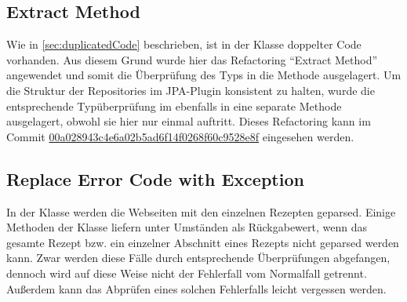 \subsection{Extract Method}
Wie in \autoref{sec:duplicatedCode} beschrieben, ist in der Klasse \href{https://github.com/anditru/quickie/blob/bb41442c7f1ffbfcd3117cd86a40f7932e543a33/0-quickie-plugin-jpa/src/main/java/org/pinkcrazyunicorn/quickie/plugins/jpa/JPAProfileRepository.java}{} doppelter Code vorhanden. Aus diesem Grund wurde hier das Refactoring \enquote{Extract Method} angewendet und somit die Überprüfung des Typs in die Methode \href{https://github.com/anditru/quickie/blob/d39394fa4590c1fd7fadc7974ee37c5416c0fc93/0-quickie-plugin-jpa/src/main/java/org/pinkcrazyunicorn/quickie/plugins/jpa/JPAProfileRepository.java#L81}{} ausgelagert. Um die Struktur der Repositories im JPA-Plugin konsistent zu halten, wurde die entsprechende Typüberprüfung im \href{https://github.com/anditru/quickie/blob/master/0-quickie-plugin-jpa/src/main/java/org/pinkcrazyunicorn/quickie/plugins/jpa/JPAProfileRepository.java}{} ebenfalls in eine separate Methode ausgelagert, obwohl sie hier nur einmal auftritt. Dieses Refactoring kann im Commit \href{https://github.com/anditru/quickie/commit/00a028943c4e6a02b5ad6f14f0268f60c9528e8f}{00a028943c4e6a02b5ad6f14f0268f60c9528e8f} eingesehen werden.

\subsection{Replace Error Code with Exception}
In der Klasse \href{https://github.com/anditru/quickie/blob/bb41442c7f1ffbfcd3117cd86a40f7932e543a33/0-quickie-plugin-scraper/src/main/java/org/pinkcrazyunicorn/quickie/plugins/scraper/HensslerScraper.java}{} werden die Webseiten mit den einzelnen Rezepten geparsed. Einige Methoden der Klasse liefern unter Umständen  als Rückgabewert, wenn das gesamte Rezept bzw. ein einzelner Abschnitt eines Rezepts nicht geparsed werden kann. Zwar werden diese Fälle durch entsprechende Überprüfungen abgefangen, dennoch wird auf diese Weise nicht der Fehlerfall vom Normalfall getrennt. Außerdem kann das Abprüfen eines solchen Fehlerfalls leicht vergessen werden.

